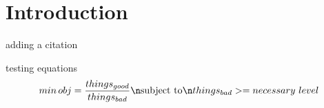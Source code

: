 \section{Introduction}

adding a citation \cite{Pouransari_2014}

testing equations
\begin{equation}
min \, obj= \frac{things_{good}}{things_{bad}} \n
\text{subject to}  \n
things_{bad}>=necessary\,\, level
\end{equation}